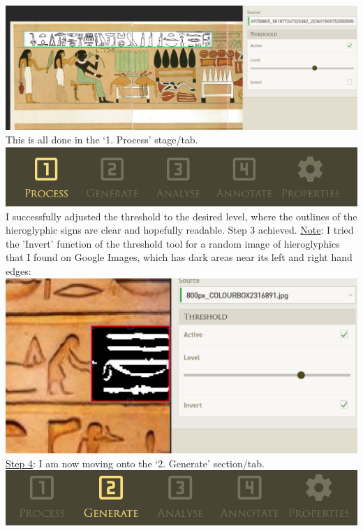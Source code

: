 \documentclass{article}
\begin{document}
\includegraphics[width=1.0\textwidth]{hiero_3.PNG}
\break \noindent This is all done in the `1. Process' stage/tab.
\newline \break
\includegraphics[width=1.0\textwidth]{hiero_4.PNG}
\break \noindent
I successfully adjusted the threshold to the desired level, where the outlines of the hieroglyphic signs are clear and hopefully readable.
\newline \break \noindent
Step 3 achieved.
\newline \break \noindent
\underline{Note}: I tried the 'Invert' function of the threshold tool for a random image of hieroglyphics that I found on Google Images, which has dark areas near its left and right hand edges:
\newline \break
\includegraphics[width=1.0\textwidth]{hiero_5.PNG}
\newline \break \noindent
\underline{Step 4}: I am now moving onto the `2. Generate' section/tab.
\newline \break
\includegraphics[width=1.0\textwidth]{hiero_7.PNG}
\end{document}
